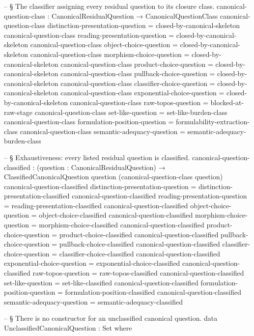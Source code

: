 \documentclass[11pt]{article}
\begin{document}
\begin{code}
-- § The classifier assigning every residual question to its closure class.
canonical-question-class : CanonicalResidualQuestion → CanonicalQuestionClass
canonical-question-class distinction-presentation-question =
  closed-by-canonical-skeleton
canonical-question-class reading-presentation-question =
  closed-by-canonical-skeleton
canonical-question-class object-choice-question = closed-by-canonical-skeleton
canonical-question-class morphism-choice-question = closed-by-canonical-skeleton
canonical-question-class product-choice-question = closed-by-canonical-skeleton
canonical-question-class pullback-choice-question = closed-by-canonical-skeleton
canonical-question-class classifier-choice-question = closed-by-canonical-skeleton
canonical-question-class exponential-choice-question = closed-by-canonical-skeleton
canonical-question-class raw-topos-question = blocked-at-raw-stage
canonical-question-class set-like-question = set-like-burden-class
canonical-question-class formulation-position-question =
  formulability-extraction-class
canonical-question-class semantic-adequacy-question =
  semantic-adequacy-burden-class

-- § Exhaustiveness: every listed residual question is classified.
canonical-question-classified :
  (question : CanonicalResidualQuestion) →
  ClassifiedCanonicalQuestion question (canonical-question-class question)
canonical-question-classified distinction-presentation-question =
  distinction-presentation-classified
canonical-question-classified reading-presentation-question =
  reading-presentation-classified
canonical-question-classified object-choice-question = object-choice-classified
canonical-question-classified morphism-choice-question = morphism-choice-classified
canonical-question-classified product-choice-question = product-choice-classified
canonical-question-classified pullback-choice-question = pullback-choice-classified
canonical-question-classified classifier-choice-question = classifier-choice-classified
canonical-question-classified exponential-choice-question = exponential-choice-classified
canonical-question-classified raw-topos-question = raw-topos-classified
canonical-question-classified set-like-question = set-like-classified
canonical-question-classified formulation-position-question =
  formulation-position-classified
canonical-question-classified semantic-adequacy-question =
  semantic-adequacy-classified

-- § There is no constructor for an unclassified canonical question.
data UnclassifiedCanonicalQuestion : Set where


\end{code}
\end{document}
